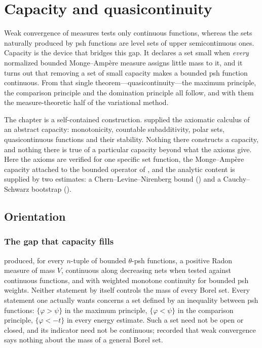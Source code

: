 \chapter{Capacity and quasicontinuity}
\label{chap:bfj-capacity}

Weak convergence of measures tests only continuous functions, whereas the
sets naturally produced by psh functions are level sets of upper
semicontinuous ones.  Capacity is the device that bridges this gap.  It
declares a set small when \emph{every} normalized bounded Monge--Amp\`ere
measure assigns little mass to it, and it turns out that removing a set of
small capacity makes a bounded psh function continuous.  From that single
theorem---quasicontinuity---the maximum principle, the comparison principle
and the domination principle all follow, and with them the measure-theoretic
half of the variational method.

The chapter is a self-contained construction.  
supplied the axiomatic calculus of an abstract capacity: monotonicity,
countable subadditivity, polar sets, quasicontinuous functions and their
stability.  Nothing there constructs a capacity, and nothing there is true of
a particular capacity beyond what the axioms give.  Here the axioms are
verified for one specific set function, the Monge--Amp\`ere capacity attached
to the bounded operator of , and the analytic content is
supplied by two estimates: a Chern--Levine--Nirenberg bound
() and a Cauchy--Schwarz bootstrap
().

\section{Orientation}
\label{sec:ch25-orientation}

\subsection{The gap that capacity fills}
\label{sec:ch25-gap}

 produced, for every $n$-tuple of bounded
$\theta$-psh functions, a positive Radon measure of mass $V$, continuous
along decreasing nets when tested against continuous functions, and with
weighted monotone continuity for bounded psh weights.  Neither statement
by itself controls the mass of every Borel set.  Every statement one actually wants
concerns a set defined by an inequality between psh functions:
$\{\varphi>\psi\}$ in the maximum principle, $\{\varphi<\psi\}$ in the
comparison principle, $\{\varphi<-t\}$ in every energy estimate.  Such a
set need not be open or closed, and its indicator need not be continuous;
 recorded that weak convergence says nothing
about the mass of a general Borel set.

